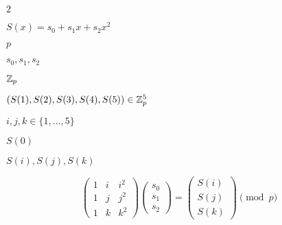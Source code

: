 \documentclass[10pt]{book}
\begin{document}
\begin{mdSnippets}
\begin{mdInlineSnippet}[c81e728d9d4c2f636f067f89cc14862c]
$2$\end{mdInlineSnippet}%
\begin{mdInlineSnippet}%
$S(x) = s_0 + s_1x+ s_2x^2$\end{mdInlineSnippet}%
\begin{mdInlineSnippet}[83878c91171338902e0fe0fb97a8c47a]%
$p$\end{mdInlineSnippet}%
\begin{mdInlineSnippet}[c65712597115c467045251bdfa95e82c]%
$s_0,s_1,s_2$\end{mdInlineSnippet}%
\begin{mdInlineSnippet}[1d845fd5c95058f0c19a8af900c11e16]%
$\mathbb{Z}_p$\end{mdInlineSnippet}%
\begin{mdInlineSnippet}[5f007ba4b07a4bb205615fed8a783650]%
$(S(1),S(2),S(3),S(4),S(5)) \in \mathbb{Z}_p^5$\end{mdInlineSnippet}%
\begin{mdInlineSnippet}[41f5bb3ed5f30daa227f789d61fb146f]%
$i,j,k \in \{1,\ldots, 5 \}$\end{mdInlineSnippet}%
\begin{mdInlineSnippet}%
$S(0)$\end{mdInlineSnippet}%
\begin{mdInlineSnippet}[45d3313779193d49b61fe9687c945348]%
$S(i),S(j),S(k)$\end{mdInlineSnippet}%
\begin{mdDisplaySnippet}[d8ed3ad9f5f4e62238861278e76932d0]%
\[%
\begin{pmatrix} 
1 & i & i^2 \\
1 & j & j^2 \\
1 & k & k^2 
\end{pmatrix}
\begin{pmatrix}
s_0 \\ s_1 \\ s_2
\end{pmatrix}
=
\begin{pmatrix}
S(i)\\S(j)\\ S(k)
\end{pmatrix} \pmod{p}
\]%
\end{mdDisplaySnippet}%

\end{mdSnippets}
\end{document}
